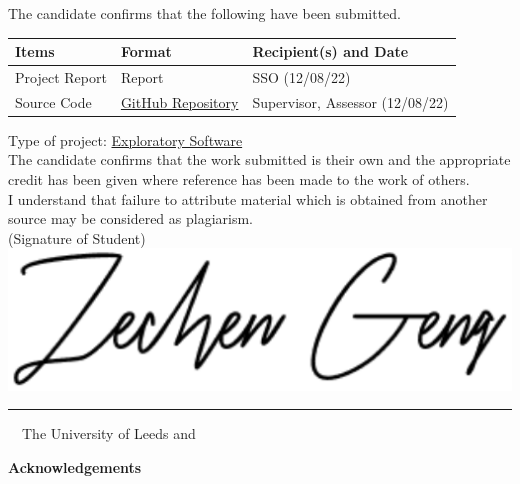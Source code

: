 \frontcover

\clearpage
\noindent The candidate confirms that the following have been submitted.\\
\begin{table}[ht!]
\begin{tabular}{|p{}|p{}|p{}|}
\hline 
Items & Format & Recipient(s) and Date \\ 
\hline 
Project Report & Report & SSO (12/08/22) \\ 
\hline
Source Code & \href{https://github.com/Strive12138/SDFProject}{GitHub Repository}& Supervisor, Assessor (12/08/22)\\

\hline
\end{tabular} 
\end{table}

\noindent Type of project: \underline{Exploratory Software}
\vspace{\fill}\\
\noindent The candidate confirms that the work submitted is their own and the appropriate credit has been given where reference has been made to the work of others.
\vspace{\fill}\\
\noindent I understand that failure to attribute material which is obtained from another source may be considered as plagiarism.
\vspace{\fill}\\
\flushright(Signature of Student)
\includegraphics[scale=0.4,right]{Images/Other/sign_Zec.png}
\rule{50mm}{1pt}
\flushleft
\vspace{\fill}
\textcopyright~\session~The University of Leeds and~\fullname

\begin{dissertationsummary}

\end{dissertationsummary}

\clearpage
\centering\textbf{Acknowledgements}
\flushleft


\tableofcontents


